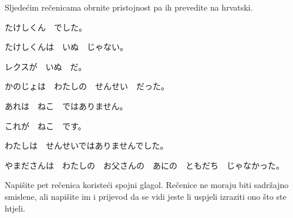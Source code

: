 
\author{Ivan Petranović}

	
	\begin{mondai}{Sljedećim rečenicama obrnite pristojnost pa ih prevedite na hrvatski.}
		\item たけしくん　でした。
		\item たけしくんは　いぬ　じゃない。
		\item レクスが　いぬ　だ。
		\item かのじょは　わたしの　せんせい　だった。
		\item あれは　ねこ　ではありません。
		\item これが　ねこ　です。
		\item わたしは　せんせいではありませんでした。
		\item やまださんは　わたしの　お父さんの　あにの　ともだち　じゃなかった。
	\end{mondai}

	\noindent
	Napišite pet rečenica koristeći spojni glagol. Rečenice ne moraju biti sadržajno smislene, ali napišite im i prijevod da se vidi jeste li uspjeli izraziti ono što ste htjeli.

